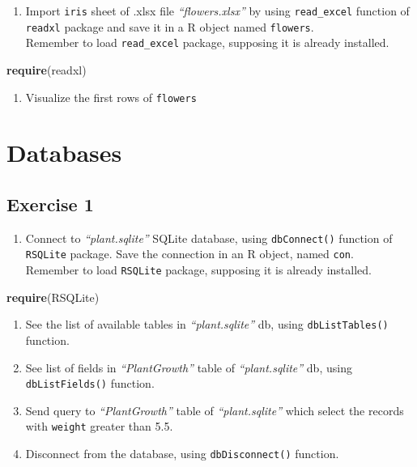 \documentclass[]{book}
\newenvironment{Shaded}{\begin{snugshade}}{\end{snugshade}}
\newcommand{\KeywordTok}[1]{\textcolor[rgb]{0.13,0.29,0.53}{\textbf{{#1}}}}
\newcommand{\NormalTok}[1]{{#1}}
\providecommand{\tightlist}{%
  \setlength{\itemsep}{0pt}\setlength{\parskip}{0pt}}
\def\tightlist{}
\begin{document}
\begin{enumerate}
\def\labelenumi{\alph{enumi}.}
\tightlist
\item
  Import \texttt{iris} sheet of .xlsx file \emph{``flowers.xlsx''} by
  using \texttt{read\_excel} function of \texttt{readxl} package and
  save it in a R object named \texttt{flowers}.\\
  Remember to load \texttt{read\_excel} package, supposing it is already
  installed.
\end{enumerate}

\begin{Shaded}
\begin{Highlighting}[]
\KeywordTok{require}\NormalTok{(readxl)}
\end{Highlighting}
\end{Shaded}

\begin{enumerate}
\def\labelenumi{\alph{enumi}.}
\setcounter{enumi}{1}
\tightlist
\item
  Visualize the first rows of \texttt{flowers}
\end{enumerate}

\section{Databases}\label{databases}

\subsection{Exercise 1}\label{exercise-1-7}

\begin{enumerate}
\def\labelenumi{\alph{enumi}.}
\tightlist
\item
  Connect to \emph{``plant.sqlite''} SQLite database, using
  \texttt{dbConnect()} function of \texttt{RSQLite} package. Save the
  connection in an R object, named \texttt{con}.\\
  Remember to load \texttt{RSQLite} package, supposing it is already
  installed.
\end{enumerate}

\begin{Shaded}
\begin{Highlighting}[]
\KeywordTok{require}\NormalTok{(RSQLite)}
\end{Highlighting}
\end{Shaded}

\begin{enumerate}
\def\labelenumi{\alph{enumi}.}
\setcounter{enumi}{1}
\item
  See the list of available tables in \emph{``plant.sqlite''} db, using
  \texttt{dbListTables()} function.
\item
  See list of fields in \emph{``PlantGrowth''} table of
  \emph{``plant.sqlite''} db, using \texttt{dbListFields()} function.
\item
  Send query to \emph{``PlantGrowth''} table of \emph{``plant.sqlite''}
  which select the records with \texttt{weight} greater than 5.5.
\item
  Disconnect from the database, using \texttt{dbDisconnect()} function.
\end{enumerate}
\end{document}
